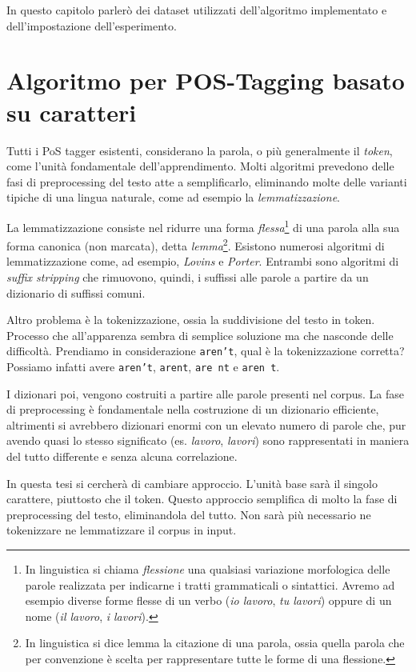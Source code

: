 \nocite{scikit-learn}

In questo capitolo parler\`o dei dataset utilizzati dell'algoritmo implementato
e dell'impostazione dell'esperimento.

\section{Algoritmo per POS-Tagging basato su caratteri}

Tutti i PoS tagger esistenti, considerano la parola, o pi\`u generalmente il
\emph{token}, come l'unit\`a fondamentale dell'apprendimento. Molti algoritmi
prevedono delle fasi di preprocessing del testo atte a semplificarlo, eliminando
molte delle varianti tipiche di una lingua naturale, come ad esempio la \emph{lemmatizzazione}.

La lemmatizzazione consiste nel ridurre una forma \emph{flessa}\footnote{In
linguistica si chiama \emph{flessione} una qualsiasi variazione morfologica delle
parole realizzata per indicarne i tratti grammaticali o sintattici. Avremo ad
esempio diverse forme flesse di un verbo (\emph{io lavoro}, \emph{tu lavori})
oppure di un nome (\emph{il lavoro}, \emph{i lavori}).} di una parola alla sua
forma canonica (non marcata), detta \emph{lemma}\footnote{In linguistica si dice
lemma la citazione di una parola, ossia quella parola che per convenzione è scelta
per rappresentare tutte le forme di una flessione.}. Esistono numerosi algoritmi
di lemmatizzazione come, ad esempio, \emph{Lovins} e \emph{Porter}. Entrambi sono
algoritmi di \emph{suffix stripping} che rimuovono, quindi, i suffissi alle
parole a partire da un dizionario di suffissi comuni.

Altro problema \`e la tokenizzazione, ossia la suddivisione del testo in token.
Processo che all'apparenza sembra di semplice soluzione ma che nasconde delle
difficolt\`a. Prendiamo in considerazione \texttt{aren't}, qual \`e la tokenizzazione
corretta? Possiamo infatti avere \texttt{aren't}, \texttt{arent}, \texttt{are nt}
e \texttt{aren t}.

I dizionari poi, vengono costruiti a partire alle parole presenti nel corpus.
La fase di preprocessing \`e fondamentale nella costruzione di un dizionario
efficiente, altrimenti si avrebbero dizionari enormi con un elevato numero di
parole che, pur avendo quasi lo stesso significato (es. \emph{lavoro}, \emph{lavori})
sono rappresentati in maniera del tutto differente e senza alcuna correlazione.

In questa tesi si cercher\`a di cambiare approccio. L'unit\`a base sar\`a il
singolo carattere, piuttosto che il token. Questo approccio semplifica di molto
la fase di preprocessing del testo, eliminandola del tutto. Non sar\`a pi\`u
necessario ne tokenizzare ne lemmatizzare il corpus in input.

